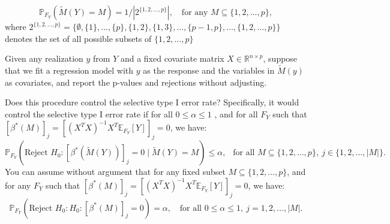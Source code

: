 \documentclass[
  letterpaper,
  DIV=11,
  numbers=noendperiod]{scrartcl}
\begin{document}
$$ \mathbb{P}_{F_Y}( \tilde M(Y) = M) = 1/|2^{\{1, 2, \ldots, p\}}|, ~~~ \text{ for any } M \subseteq \{1, 2, \ldots, p\},$$ where $2^{\{1, 2, \ldots, p\}} = \{ \emptyset, \{1\}, \ldots, \{p\}, \{1, 2\}, \{1, 3\}, \ldots, \{p-1, p\}, \ldots, \{1, 2, \ldots, p\}\}$ denotes the set of all possible subsets of $\{1, 2, \ldots, p\}$

Given any realization $y$ from $Y$ and a fixed covariate matrix $X \in \mathbb{R}^{n \times p}$, suppose that we fit a regression model with $y$ as the response and the variables in $\tilde M(y)$ as covariates, and report the p-values and rejections without adjusting.

Does this procedure control the selective type I error rate? Specifically, it would control the selective type I error rate if for all $0 \leq \alpha \leq 1$ , and for all $F_Y$ such that $[\beta^*(M)]_j = [(X^TX)^{-1} X^T \mathbb{E}_{F_Y}[Y]]_j = 0$, we have:\
$$\mathbb{P}_{F_Y}(\text{Reject } H_{0}: [\beta^*(\tilde M(Y))]_j = 0 \mid \tilde M(Y) = M) \leq \alpha, ~~ \text{ for all } M \subseteq \{1, 2, \ldots, p\}, ~ j \in \{1, 2, \ldots, |M|\}.$$ You can assume without argument that for any fixed subset $M \subseteq \{1, 2, \ldots, p\}$, and for any $F_Y$ such that $[\beta^*(M)]_j = [(X^TX)^{-1} X^T \mathbb{E}_{F_Y}[Y]]_j = 0$, we have: $$ \mathbb{P}_{F_Y}(\text{Reject } H_0: H_{0}: [\beta^*(M)]_j = 0) = \alpha, ~~~ \text{ for all } 0 \leq \alpha \leq 1, ~ j = 1, 2, \ldots, |M|.$$
\end{document}
